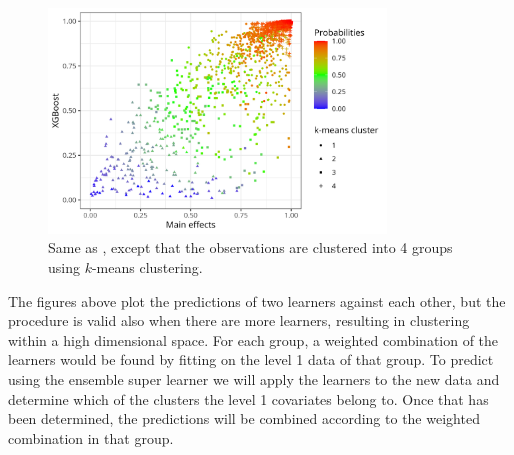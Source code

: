 \documentclass[./main.tex]{subfiles}
\begin{document}
\begin{figure}[H]
    \centering
    \includegraphics[width=0.8\textwidth]{figures/esl_preds_xgboost_vs_main_kmeans.png}
\caption{Same as , except that the observations are clustered into 4 groups using $ k $-means clustering.}
    \label{fig:esl_preds_xgboost_vs_main_kmeans}
\end{figure}
The figures above plot the predictions of two learners against each other, but the procedure is valid also when there are more learners, resulting in clustering within a high dimensional space. For each group, a weighted combination of the learners would be found by fitting on the level 1 data of that group. To predict using the ensemble super learner we will apply the learners to the new data and determine which of the clusters the level 1 covariates belong to. Once that has been determined, the predictions will be combined according to the weighted combination in that group. 
\end{document}
